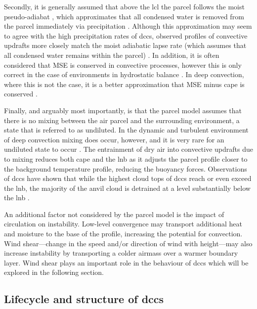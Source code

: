 Secondly, it is generally assumed that above the \acrshort{lcl} the parcel follows the moist pseudo-adiabat \citep{peters_generalized_2022}, which approximates that all condensed water is removed from the parcel immediately via precipitation \citep{emanuel_atmospheric_1994}. 
Although this approximation may seem to agree with the high precipitation rates of \acrshort{dcc}s, observed profiles of convective updrafts more closely match the moist adiabatic lapse rate (which assumes that all condensed water remains within the parcel) \citep{xu_is_1989}. 
In addition, it is often considered that MSE is conserved in convective processes, however this is only correct in the case of environments in hydrostatic balance \citep{peters_evaluating_2021}. 
In deep convection, where this is not the case, it is a better approximation that MSE minus \acrshort{cape} is conserved \citep{romps_mse_2015}.

Finally, and arguably most importantly, is that the parcel model assumes that there is no mixing between the air parcel and the surrounding environment, a state that is referred to as undiluted. 
In the dynamic and turbulent environment of deep convection mixing does occur, however, and it is very rare for an undiluted state to occur \citep{romps_undiluted_2010}. 
The entrainment of dry air into convective updrafts due to mixing reduces both \acrshort{cape} \citep{zhang_effects_2009} and the \acrshort{lnb} \citep{masunaga_convective_2016} as it adjusts the parcel profile closer to the background temperature profile, reducing the buoyancy forces. 
Observations of \acrshort{dcc}s have shown that while the highest cloud tops of \acrshort{dcc}s reach or even exceed the \acrshort{lnb}, the majority of the anvil cloud is detrained at a level substantially below the \acrshort{lnb} \citep{takahashi_where_2012, takahashi_level_2017}.

An additional factor not considered by the parcel model is the impact of circulation on instability.
Low-level convergence may transport additional heat and moisture to the base of the profile, increasing the potential for convection.
Wind shear---change in the speed and/or direction of wind with height---may also increase instability by transporting a colder airmass over a warmer boundary layer.
Wind shear plays an important role in the behaviour of \acrshort{dcc}s which will be explored in the following section.

\subsection{Lifecycle and structure of \acrshort{dcc}s}

